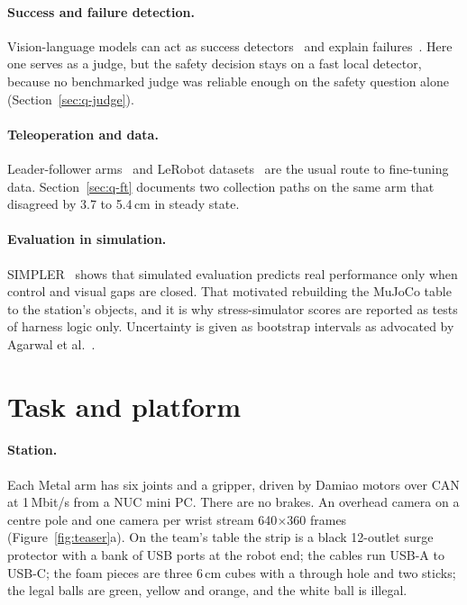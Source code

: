 \documentclass[10pt]{article}
\begin{document}
\paragraph{Success and failure detection.} Vision-language models can act as success detectors~\cite{du2023success}
and explain failures~\cite{liu2023reflect}. Here one serves as a judge, but the safety decision stays on a fast local
detector, because no benchmarked judge was reliable enough on the safety question alone
(Section~\ref{sec:q-judge}).

\paragraph{Teleoperation and data.} Leader-follower arms~\cite{zhao2023aloha,wu2023gello} and LeRobot
datasets~\cite{cadene2024lerobot} are the usual route to fine-tuning data. Section~\ref{sec:q-ft} documents two
collection paths on the same arm that disagreed by 3.7 to 5.4\,cm in steady state.

\paragraph{Evaluation in simulation.} SIMPLER~\cite{li2024simpler} shows that simulated evaluation predicts real
performance only when control and visual gaps are closed. That motivated rebuilding the MuJoCo table to the station's
objects, and it is why stress-simulator scores are reported as tests of harness logic only. Uncertainty is given as
bootstrap intervals as advocated by Agarwal et al.~\cite{agarwal2021precipice}.

\section{Task and platform}
\label{sec:platform}

\paragraph{Station.} Each Metal arm has six joints and a gripper, driven by Damiao motors over CAN at 1\,Mbit/s from
a NUC mini PC. There are no brakes. An overhead camera on a centre pole and one camera per wrist stream 640$\times$360
frames (Figure~\ref{fig:teaser}a). On the team's table the strip is a black 12-outlet surge protector with a bank of USB
ports at the robot end; the cables run USB-A to USB-C; the foam pieces are three 6\,cm cubes with a through hole and two
sticks; the legal balls are green, yellow and orange, and the white ball is illegal.
\end{document}
